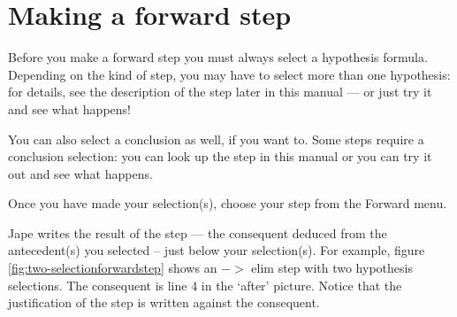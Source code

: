 \documentclass[11pt]{book}
\newcommand{\figref}[1]{figure \ref{fig:#1}}
\begin{document}
\section{Making a forward step}

Before you make a forward step you must always select a hypothesis formula. Depending on the kind of step, you may have to select more than one hypothesis: for details, see the description of the step later in this manual --- or just try it and see what happens!

You can also select a conclusion as well, if you want to. Some steps require a conclusion selection: you can look up the step in this manual or you can try it out and see what happens. 

Once you have made your selection(s), choose your step from the Forward menu.

Jape writes the result of the step --- the consequent deduced from the antecedent(s) you selected -- just below your selection(s). For example, \figref{two-selectionforwardstep} shows an $->$ elim step with two hypothesis selections. The consequent is line 4 in the `after' picture. Notice that the justification of the step is written against the consequent.
\end{document}
